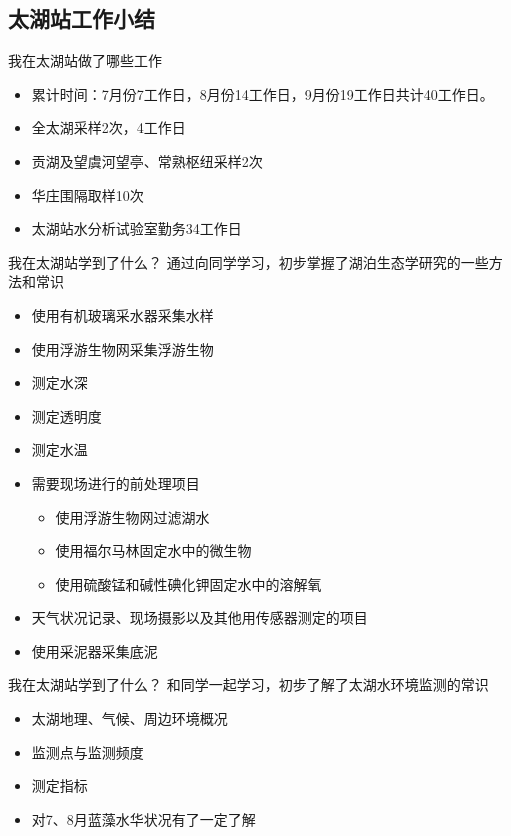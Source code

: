 \documentclass[CJKutf8]{beamer}
\newenvironment{SC}{%
  \CJKfamily{gbsn}%
  \CJKtilde
  \CJKnospace}{}
\begin{document}
\begin{CJK}{UTF8}{}
\begin{SC}
\subsection{太湖站工作小结}

\begin{frame}{我在太湖站做了哪些工作}
  \begin{itemize}
  \item
  累计时间：7月份7工作日，8月份14工作日，9月份19工作日共计40工作日。
  \pause
  \item 全太湖采样2次，4工作日
  \item 贡湖及望虞河望亭、常熟枢纽采样2次
  \item 华庄围隔取样10次
  \item 太湖站水分析试验室勤务34工作日
  \end{itemize}
\end{frame}

\begin{frame}{我在太湖站学到了什么？}
通过向同学学习，初步掌握了湖泊生态学研究的一些方法和常识
  \begin{itemize}
  \item 使用有机玻璃采水器采集水样
  \item 使用浮游生物网采集浮游生物
  \item 测定水深
  \item 测定透明度
  \item 测定水温
  \item 需要现场进行的前处理项目
    \begin{itemize}
       \item 使用浮游生物网过滤湖水
       \item 使用福尔马林固定水中的微生物
       \item 使用硫酸锰和碱性碘化钾固定水中的溶解氧
    \end{itemize}
  \item 天气状况记录、现场摄影以及其他用传感器测定的项目
  \item 使用采泥器采集底泥
  \end{itemize}
\end{frame}

\begin{frame}{我在太湖站学到了什么？}
和同学一起学习，初步了解了太湖水环境监测的常识
  \begin{itemize}
  \item 太湖地理、气候、周边环境概况
  \item 监测点与监测频度
  \item 测定指标
  \item 对7、8月蓝藻水华状况有了一定了解
  \end{itemize}
\end{frame}


\end{SC}
\end{CJK}
\end{document}
